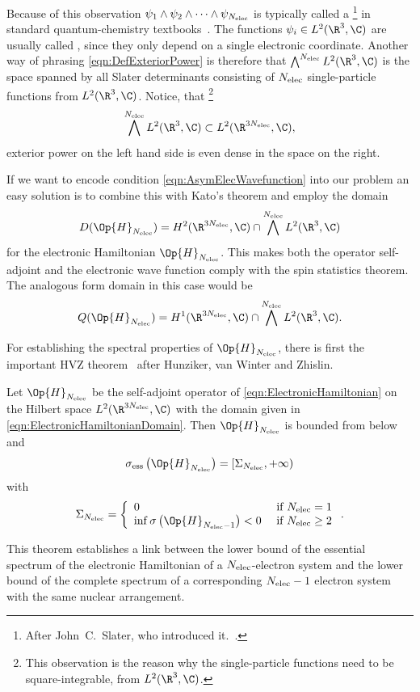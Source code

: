 Because of this observation $\psi_1 \wedge \psi_2 \wedge \cdots \wedge \psi_{N_\text{elec}}$
is typically called a %
\footnote{After John~C.~Slater, who introduced it.~\cite{Slater1929,Slater1930a}.}
in standard quantum-chemistry textbooks~\cite{Szabo1996,Helgaker2013}.
The functions $\psi_i \in L^2(\R^3, \C)$
are usually called ,
since they only depend on a single electronic coordinate.
Another way of phrasing \eqref{eqn:DefExteriorPower}
is therefore that $\bigwedge^{\Nelec} L^2(\R^3, \C)$
is the space spanned by all Slater determinants
consisting of $N_\text{elec}$ single-particle functions from $L^2(\R^3, \C)$.
Notice, that%
\footnote{%
	This observation is the reason why the single-particle functions
	need to be square-integrable, \ie from $L^2(\R^3, \C)$.
}
\[ \bigwedge^{\Nelec} L^2(\R^3, \C) \subset L^2(\R^{3\Nelec}, \C), \]
exterior power on the left hand side is even dense in the space on the right.

If we want to encode condition \eqref{eqn:AsymElecWavefunction}
into our problem an easy solution is to combine this with Kato's theorem
and employ the domain
\begin{equation}
	D(\Op{H}_{\Nelec}) = H^2(\R^{3\Nelec}, \C) \cap \bigwedge^{\Nelec} L^2(\R^3, \C)
	\label{eqn:ElectronicHamiltonianDomain}
\end{equation}
for the electronic Hamiltonian $\Op{H}_{\Nelec}$.
This makes both the operator self-adjoint and the electronic wave function
comply with the spin statistics theorem.
The analogous form domain in this case would be
\[ Q(\Op{H}_{\Nelec}) = H^1(\R^{3\Nelec}, \C) \cap \bigwedge^{\Nelec} L^2(\R^3, \C). \]

For establishing the spectral properties of $\Op{H}_{\Nelec}$,
there is first the important HVZ theorem~\cite{Zhislin1959,Zhislin1960,Reed1978,Teschl2014}
after Hunziker, van Winter and Zhislin.
\begin{thm}[HVZ]
	\label{thm:HVZ}
	Let $\Op{H}_{\Nelec}$ be the self-adjoint operator of \eqref{eqn:ElectronicHamiltonian}
	on the Hilbert space $L^2(\R^{3\Nelec}, \C)$
	with the domain given in \eqref{eqn:ElectronicHamiltonianDomain}.
	Then $\Op{H}_{\Nelec}$ is bounded from below and
	\[ \sigma_\text{ess}\left(\Op{H}_{\Nelec}\right) = [\Sigma_{\Nelec}, +\infty) \]
	with
	\[ \Sigma_{\Nelec} = \left\{
		\begin{array}{ll}
			0 & \text{ if $\Nelec = 1$} \\
			\inf \sigma\left(\Op{H}_{\Nelec-1}\right) < 0 & \text{ if $\Nelec \geq 2$}
		\end{array}
		\right. .
	\]
\end{thm}
This theorem establishes a link between
the lower bound of the essential spectrum
of the electronic Hamiltonian of a $N_\text{elec}$-electron system
and the lower bound of the complete spectrum of
a corresponding $N_\text{elec} - 1$ electron system
with the same nuclear arrangement.


